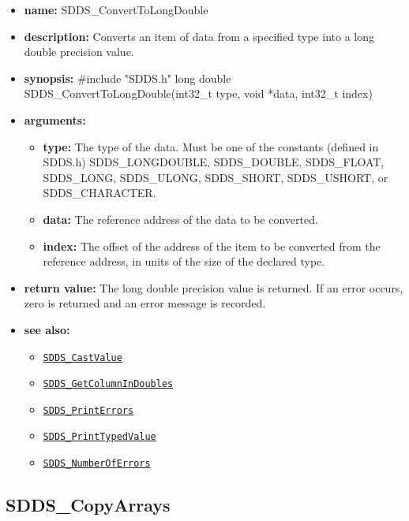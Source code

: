 \documentclass[11pt]{article}
\newcommand{\progref}[1]{\hyperref[SDDS_#1]{\tt SDDS\_#1}}
\begin{document}
\begin{itemize}
\item {\bf name:}\newline
SDDS\_ConvertToLongDouble
\item {\bf description:}\newline
Converts an item of data from a specified type into a long double precision value.
\item {\bf synopsis:} \#include "SDDS.h"\newline
long double SDDS\_ConvertToLongDouble(int32\_t type, void *data, int32\_t index)
\item {\bf arguments:}
\begin{itemize}
\item {\bf type:} The type of the data. Must be one of the constants (defined in SDDS.h) SDDS\_LONGDOUBLE, SDDS\_DOUBLE, SDDS\_FLOAT, SDDS\_LONG, SDDS\_ULONG, SDDS\_SHORT, SDDS\_USHORT, or SDDS\_CHARACTER.
\item {\bf data:} The reference address of the data to be converted.
\item {\bf index:} The offset of the address of the item to be converted from the reference address, in units of the size of the declared type.
\end{itemize}
\item {\bf return value:}\newline
The long double precision value is returned. If an error occurs, zero is returned and an error message is recorded.
\item {\bf see also:}
\begin{itemize}
\item \progref{CastValue}
\item \progref{GetColumnInDoubles}
\item \progref{PrintErrors}
\item \progref{PrintTypedValue}
\item \progref{NumberOfErrors}
\end{itemize}
\end{itemize}

\subsection{SDDS\_CopyArrays}
\label{SDDS_CopyArrays}
\end{document}
